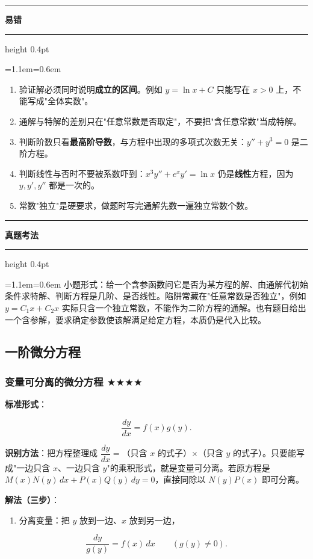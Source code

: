 \documentclass[11pt,openany,UTF8]{ctexbook}
\newcommand{\callouthead}[2]{%
  \par\addvspace{7pt}\noindent
  {\color{#1}\rule[-0.15em]{3pt}{1.05em}}\hspace{0.5em}%
  {\bfseries\color{#1}#2}\par\nobreak\vspace{-0.35em}%
  {\color{rulesep}\hrule height 0.4pt}\nobreak\vspace{0.45em}%
  \begingroup\small\setlength{\parindent}{0pt}%
  \leftskip=1.1em\rightskip=0.6em\noindent\ignorespaces}
\newcommand{\calloutend}{\par\endgroup\addvspace{7pt}}
\newenvironment{callwarn}[1]{\callouthead{warnbar}{#1}}{\calloutend}
\newenvironment{callexam}[1]{\callouthead{exambar}{#1}}{\calloutend}
\begin{document}
\begin{callwarn}{易错}
\begin{enumerate}
\item 验证解必须同时说明\textbf{成立的区间}。例如 $y=\ln x+C$ 只能写在 $x>0$ 上，不能写成"全体实数"。
\item 通解与特解的差别只在"任意常数是否取定"，不要把"含任意常数"当成特解。
\item 判断阶数只看\textbf{最高阶导数}，与方程中出现的多项式次数无关：$y''+y^3=0$ 是二阶方程。
\item 判断线性与否时不要被系数吓到：$x^3y''+e^{x}y'=\ln x$ 仍是\textbf{线性}方程，因为 $y,y',y''$ 都是一次的。
\item 常数"独立"是硬要求，做题时写完通解先数一遍独立常数个数。
\end{enumerate}
\end{callwarn}

\begin{callexam}{真题考法}
小题形式：给一个含参函数问它是否为某方程的解、由通解代初始条件求特解、判断方程是几阶、是否线性。陷阱常藏在"任意常数是否独立"，例如 $y=C_1x+C_2x$ 实际只含一个独立常数，不能作为二阶方程的通解。也有题目给出一个含参解，要求确定参数使该解满足给定方程，本质仍是代入比较。

\end{callexam}

\subsection{一阶微分方程}

\subsubsection{变量可分离的微分方程 $\bigstar$$\bigstar$$\bigstar$$\bigstar$}

\textbf{标准形式}：

\[\frac{dy}{dx}=f(x)g(y) .\]

\textbf{识别方法}：把方程整理成 $\dfrac{dy}{dx}=$（只含 $x$ 的式子）$\times$（只含 $y$ 的式子）。只要能写成"一边只含 $x$、一边只含 $y$"的乘积形式，就是变量可分离。若原方程是 $M(x)N(y)\,dx+P(x)Q(y)\,dy=0$，直接同除以 $N(y)P(x)$ 即可分离。

\textbf{解法（三步）}：

\begin{enumerate}
\item 分离变量：把 $y$ 放到一边、$x$ 放到另一边，
\end{enumerate}
\[\frac{dy}{g(y)}=f(x)\,dx\qquad (g(y)\ne 0).\]
\end{document}
